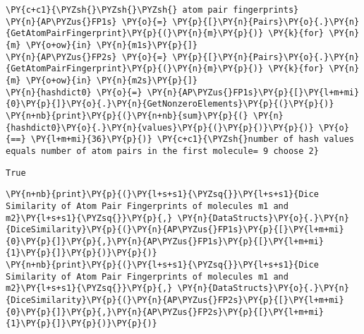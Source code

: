 \begin{tcolorbox}[breakable, size=fbox, boxrule=1pt, pad at break*=1mm,colback=cellbackground, colframe=cellborder]
\begin{Verbatim}[commandchars=\\\{\}]
\PY{c+c1}{\PYZsh{}\PYZsh{}\PYZsh{} atom pair fingerprints}
\PY{n}{AP\PYZus{}FP1s} \PY{o}{=} \PY{p}{[}\PY{n}{Pairs}\PY{o}{.}\PY{n}{GetAtomPairFingerprint}\PY{p}{(}\PY{n}{m}\PY{p}{)} \PY{k}{for} \PY{n}{m} \PY{o+ow}{in} \PY{n}{m1s}\PY{p}{]}
\PY{n}{AP\PYZus{}FP2s} \PY{o}{=} \PY{p}{[}\PY{n}{Pairs}\PY{o}{.}\PY{n}{GetAtomPairFingerprint}\PY{p}{(}\PY{n}{m}\PY{p}{)} \PY{k}{for} \PY{n}{m} \PY{o+ow}{in} \PY{n}{m2s}\PY{p}{]}
\PY{n}{hashdict0} \PY{o}{=} \PY{n}{AP\PYZus{}FP1s}\PY{p}{[}\PY{l+m+mi}{0}\PY{p}{]}\PY{o}{.}\PY{n}{GetNonzeroElements}\PY{p}{(}\PY{p}{)}
\PY{n+nb}{print}\PY{p}{(}\PY{n+nb}{sum}\PY{p}{(} \PY{n}{hashdict0}\PY{o}{.}\PY{n}{values}\PY{p}{(}\PY{p}{)}\PY{p}{)} \PY{o}{==} \PY{l+m+mi}{36}\PY{p}{)} \PY{c+c1}{\PYZsh{}number of hash values equals number of atom pairs in the first molecule= 9 choose 2}
\end{Verbatim}
\end{tcolorbox}

\begin{Verbatim}[commandchars=\\\{\}]
True
\end{Verbatim}

\begin{tcolorbox}[breakable, size=fbox, boxrule=1pt, pad at break*=1mm,colback=cellbackground, colframe=cellborder]
\begin{Verbatim}[commandchars=\\\{\}]
\PY{n+nb}{print}\PY{p}{(}\PY{l+s+s1}{\PYZsq{}}\PY{l+s+s1}{Dice Similarity of Atom Pair Fingerprints of molecules m1 and m2}\PY{l+s+s1}{\PYZsq{}}\PY{p}{,} \PY{n}{DataStructs}\PY{o}{.}\PY{n}{DiceSimilarity}\PY{p}{(}\PY{n}{AP\PYZus{}FP1s}\PY{p}{[}\PY{l+m+mi}{0}\PY{p}{]}\PY{p}{,}\PY{n}{AP\PYZus{}FP1s}\PY{p}{[}\PY{l+m+mi}{1}\PY{p}{]}\PY{p}{)}\PY{p}{)}
\PY{n+nb}{print}\PY{p}{(}\PY{l+s+s1}{\PYZsq{}}\PY{l+s+s1}{Dice Similarity of Atom Pair Fingerprints of molecules m1 and m2}\PY{l+s+s1}{\PYZsq{}}\PY{p}{,} \PY{n}{DataStructs}\PY{o}{.}\PY{n}{DiceSimilarity}\PY{p}{(}\PY{n}{AP\PYZus{}FP2s}\PY{p}{[}\PY{l+m+mi}{0}\PY{p}{]}\PY{p}{,}\PY{n}{AP\PYZus{}FP2s}\PY{p}{[}\PY{l+m+mi}{1}\PY{p}{]}\PY{p}{)}\PY{p}{)}
\end{Verbatim}
\end{tcolorbox}

